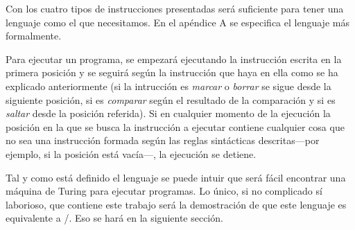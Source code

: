 Con los cuatro tipos de instrucciones presentadas será suficiente para tener una lenguaje como el
que necesitamos. En el apéndice A se especifica el lenguaje más formalmente.

Para ejecutar un programa, se empezará ejecutando la instrucción escrita en la primera posición y se
seguirá según la instrucción que haya en ella como se ha explicado anteriormente (si la intrucción
es {\it marcar} o {\it borrar} se sigue desde la siguiente posición, si es {\it comparar} según el
resultado de la comparación y si es {\it saltar} desde la posición referida). Si en cualquier
momento de la ejecución la posición en la que se busca la instrucción a ejecutar contiene cualquier
cosa que no sea una instrucción formada según las reglas sintácticas descritas---por ejemplo, si la
posición está vacía---, la ejecución se detiene.

Tal y como está definido el lenguaje se puede intuir que será fácil encontrar una máquina de Turing
para ejecutar programas. Lo único, si no complicado sí laborioso, que contiene este trabajo será la
demostración de que este lenguaje es equivalente a \C/. Eso se hará en la siguiente sección.
